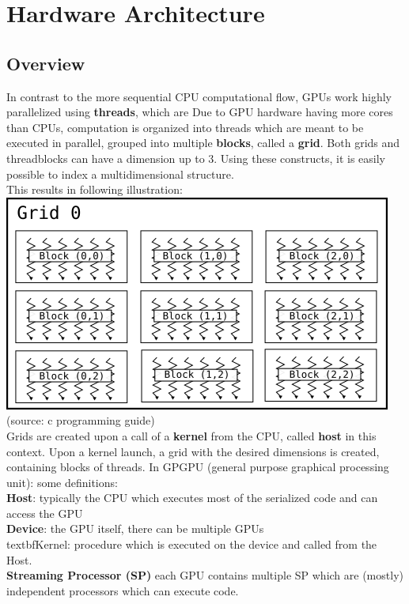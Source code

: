 \section{Hardware Architecture}
\label{sec:hardware}
\subsection{Overview}
In contrast to the more sequential CPU computational flow, GPUs work highly parallelized using \textbf{threads}, which are 
Due to GPU hardware having more cores than CPUs, computation is organized into threads which are meant to be executed in parallel, grouped into multiple \textbf{blocks}, called a \textbf{grid}. Both grids and threadblocks can have a dimension up to 3. Using these constructs, it is easily possible to index a multidimensional structure.\\
This results in following illustration:\\
\includegraphics[scale=0.6]{media/threads_blocks_grid.png}
(source: c programming guide)
\\
Grids are created upon a call of a \textbf{kernel} from the CPU, called \textbf{host} in this context.
Upon a kernel launch, a grid with the desired dimensions is created, containing blocks of threads.
In GPGPU (general purpose graphical processing unit):
some definitions:\\
\textbf{Host}: typically the CPU which executes most of the serialized code and can access the GPU\\
\textbf{Device}: the GPU itself, there can be multiple GPUs\\
textbf{Kernel}: procedure which is executed on the device and called from the Host.\\
\textbf{Streaming Processor (SP)} each GPU contains multiple SP which are (mostly) independent processors which can execute code.
